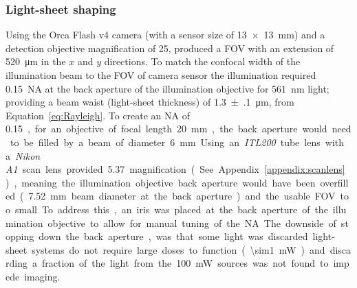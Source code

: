 \clearpage
%


\subsubsection{Light-sheet shaping} %


Using the Orca Flash v4 camera (with a sensor size of \SI[product-units=repeat]{13x13}{\milli\meter}) and a detection objective magnification of \SI{25}{\times}, produced a \gls{FOV} with an extension of
\SI{520}{\micro\meter} in the \(x\) and \(y\) directions.
To match the confocal width of the illumination beam to the \gls{FOV} of camera sensor the illumination required \SI{0.15}{}~\gls{NA} at the back aperture of the illumination objective for \SI{561}{\nano\meter} light; providing a beam waist (\gls{light-sheet} thickness) of \SI{1.3(1)}{\micro\meter}, from Equation~\ref{eq:Rayleigh}.
To create an \gls{NA} of \SI{0.15}, for an objective of focal length \SI{20}{\milli\meter}, the back aperture would need to be filled by a beam of diameter \SI{6}{\milli\meter}.

Using an \emph{ITL200} tube lens with a \emph{Nikon A1} scan lens provided \SI{5.37}{\times} magnification (See Appendix~\ref{appendix:scanlens}), meaning the illumination objective back aperture would have been overfilled (\SI{7.52}{\milli\meter} beam diameter at the back aperture) and the usable \gls{FOV} too small.
To address this, an iris was placed at the back aperture of the illumination objective to allow for manual tuning of the \gls{NA}.
The downside of stopping down the back aperture, was that some light was discarded
\Gls{light-sheet} systems do not require large doses to function (\SI{\sim1}{\milli\watt}) and discarding a fraction of the light from the \SI{100}{\milli\watt} sources was not found to impede imaging.


